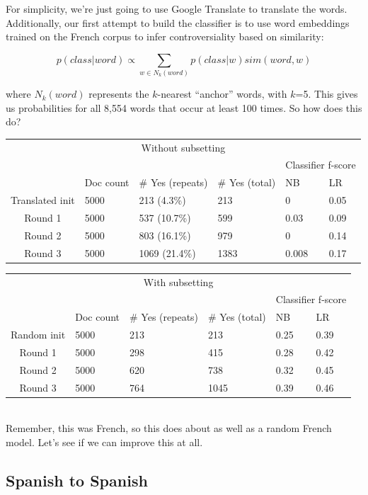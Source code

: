 \documentclass[11pt]{article} %
\begin{document}
For simplicity, we're just going to use Google Translate to translate the words. Additionally, our first attempt to build the classifier is to use word embeddings trained on the French corpus to infer controversiality based on similarity:

\[ p(class|word) \propto \sum_{w\in N_k(word)} p(class|w) sim(word,w) \]

where $N_k(word)$ represents the $k$-nearest ``anchor'' words, with $k$=5. This gives us probabilities for all 8,554 words that occur at least 100 times. So how does this do?\\

\begin{tabular}{|c|l|l|l|l|l|}
\multicolumn{6}{|c|}{Without subsetting} \\
\rowcolor{gray!50} &&&& \multicolumn{2}{|c|}{Classifier f-score} \\
\rowcolor{gray!50} & Doc count & \# Yes (repeats) & \# Yes (total) & NB & LR \\
Translated init & 5000 & 213 (4.3\%) & 213 & 0 & 0.05 \\
Round 1 & 5000 &  537 (10.7\%) & 599 & 0.03 & 0.09 \\
Round 2 & 5000 &  803 (16.1\%) & 979 & 0 & 0.14 \\
Round 3 & 5000 & 1069 (21.4\%) & 1383 & 0.008 & 0.17 \\
\end{tabular}
\quad
\begin{tabular}{|c|l|l|l|l|l|}
\multicolumn{6}{|c|}{With subsetting} \\
\rowcolor{gray!50} &&&& \multicolumn{2}{|c|}{Classifier f-score} \\
\rowcolor{gray!50} & Doc count & \# Yes (repeats) & \# Yes (total) & NB & LR \\
Random init & 5000 & 213 & 213 & 0.25 & 0.39 \\
Round 1 & 5000 & 298 & 415 & 0.28 & 0.42 \\
Round 2 & 5000 & 620 & 738 & 0.32 & 0.45 \\
Round 3 & 5000 & 764 & 1045 & 0.39 & 0.46 \\
\end{tabular} \\

Remember, this was French, so this does about as well as a random French model. Let's see if we can improve this at all.

\subsection{Spanish to Spanish}
\end{document}
